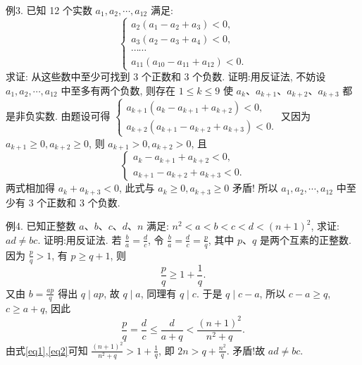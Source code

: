 例3. 已知 12 个实数 $a_1, a_2, \cdots, a_{12}$ 满足:
$$
\left\{\begin{array}{l}
a_2\left(a_1-a_2+a_3\right)<0, \\
a_3\left(a_2-a_3+a_4\right)<0, \\
\cdots \cdots \\
a_{11}\left(a_{10}-a_{11}+a_{12}\right)<0 .
\end{array}\right.
$$
求证: 从这些数中至少可找到 3 个正数和 3 个负数.
证明:用反证法, 不妨设 $a_1, a_2, \cdots, a_{12}$ 中至多有两个负数, 则存在 $1 \leqslant k \leqslant 9$ 使 $a_k 、 a_{k+1} 、 a_{k+2} 、 a_{k+3}$ 都是非负实数.
由题设可得 $\left\{\begin{array}{l}a_{k+1}\left(a_k-a_{k+1}+a_{k+2}\right)<0, \\ a_{k+2}\left(a_{k+1}-a_{k+2}+a_{k+3}\right)<0 .\end{array}\right.$
又因为 $a_{k+1} \geqslant 0, a_{k+2} \geqslant 0$, 则 $a_{k+1}>0, a_{k+2}>0$, 且
$$
\left\{\begin{array}{l}
a_k-a_{k+1}+a_{k+2}<0, \\
a_{k+1}-a_{k+2}+a_{k+3}<0 .
\end{array}\right.
$$
两式相加得 $a_k+a_{k+3}<0$, 此式与 $a_k \geqslant 0, a_{k+3} \geqslant 0$ 矛盾! 所以 $a_1, a_2, \cdots, a_{12}$ 中至少有 3 个正数和 3 个负数.



例4. 已知正整数 $a 、 b 、 c 、 d 、 n$ 满足: $n^2<a<b<c<d<(n+1)^2$, 求证: $a d \neq b c$.
证明:用反证法.
若 $\frac{b}{a}=\frac{d}{c}$, 令 $\frac{b}{a}=\frac{d}{c}=\frac{p}{q}$, 其中 $p 、 q$ 是两个互素的正整数.
因为 $\frac{p}{q}>1$, 有 $p \geqslant q+1$, 则
$$
\frac{p}{q} \geqslant 1+\frac{1}{q} . \label{eq1}
$$
又由 $b=\frac{a p}{q}$ 得出 $q \mid a p$, 故 $q \mid a$, 同理有 $q \mid c$. 于是 $q \mid c-a$, 所以 $c-a \geqslant q$, $c \geqslant a+q$, 因此
$$
\frac{p}{q}=\frac{d}{c} \leqslant \frac{d}{a+q}<\frac{(n+1)^2}{n^2+q} . \label{eq2}
$$
由式\ref{eq1},\ref{eq2}可知 $\frac{(n+1)^2}{n^2+q}>1+\frac{1}{q}$, 即 $2 n>q+\frac{n^2}{q}$. 矛盾!故 $a d \neq b c$.



